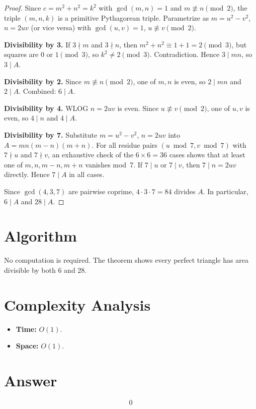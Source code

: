 \documentclass[12pt]{article}
\begin{document}
\begin{proof}
Since $c = m^2+n^2 = k^2$ with $\gcd(m,n)=1$ and $m\not\equiv n\pmod{2}$, the triple $(m,n,k)$ is a primitive Pythagorean triple. Parametrize as $m = u^2-v^2$, $n = 2uv$ (or vice versa) with $\gcd(u,v)=1$, $u\not\equiv v\pmod{2}$.

\medskip\noindent\textbf{Divisibility by 3.}
If $3\nmid m$ and $3\nmid n$, then $m^2+n^2 \equiv 1+1 = 2\pmod{3}$, but squares are $0$ or $1\pmod{3}$, so $k^2\neq 2\pmod{3}$. Contradiction. Hence $3 \mid mn$, so $3 \mid A$.

\medskip\noindent\textbf{Divisibility by 2.}
Since $m\not\equiv n\pmod{2}$, one of $m,n$ is even, so $2 \mid mn$ and $2 \mid A$. Combined: $6 \mid A$.

\medskip\noindent\textbf{Divisibility by 4.}
WLOG $n = 2uv$ is even. Since $u\not\equiv v\pmod{2}$, one of $u,v$ is even, so $4 \mid n$ and $4 \mid A$.

\medskip\noindent\textbf{Divisibility by 7.}
Substitute $m = u^2-v^2$, $n = 2uv$ into $A = mn(m-n)(m+n)$. For all residue pairs $(u\bmod 7, v\bmod 7)$ with $7\nmid u$ and $7\nmid v$, an exhaustive check of the $6\times 6 = 36$ cases shows that at least one of $m, n, m-n, m+n$ vanishes mod~7. If $7\mid u$ or $7\mid v$, then $7\mid n = 2uv$ directly. Hence $7 \mid A$ in all cases.

\medskip
Since $\gcd(4,3,7)$ are pairwise coprime, $4\cdot 3\cdot 7 = 84$ divides $A$. In particular, $6\mid A$ and $28 \mid A$.
\end{proof}

\section{Algorithm}

No computation is required. The theorem shows every perfect triangle has area divisible by both 6 and 28.

\section{Complexity Analysis}

\begin{itemize}
\item \textbf{Time:} $O(1)$.
\item \textbf{Space:} $O(1)$.
\end{itemize}

\section{Answer}

\[
\boxed{0}
\]
\end{document}
